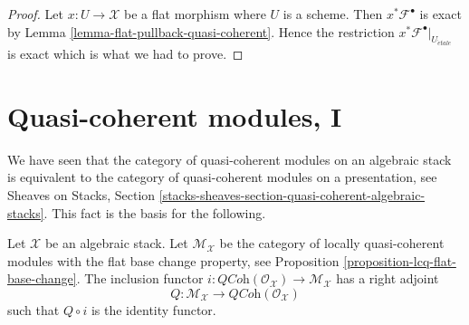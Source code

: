\begin{proof}
Let $x : U \to \mathcal{X}$ be a flat morphism where $U$ is a scheme.
Then $x^*\mathcal{F}^\bullet$ is exact by
Lemma \ref{lemma-flat-pullback-quasi-coherent}.
Hence the restriction $x^*\mathcal{F}^\bullet|_{U_{\acute{e}tale}}$
is exact which is what we had to prove.
\end{proof}





\section{Quasi-coherent modules, I}
\label{section-quasi-coherent}

\noindent
We have seen that the category of quasi-coherent modules on an algebraic
stack is equivalent to the category of quasi-coherent modules on a
presentation, see
Sheaves on Stacks, Section
\ref{stacks-sheaves-section-quasi-coherent-algebraic-stacks}.
This fact is the basis for the following.

\begin{lemma}
\label{lemma-adjoint}
Let $\mathcal{X}$ be an algebraic stack. Let $\mathcal{M}_\mathcal{X}$
be the category of locally quasi-coherent modules with the
flat base change property, see
Proposition \ref{proposition-lcq-flat-base-change}.
The inclusion functor
$i : \textit{QCoh}(\mathcal{O}_\mathcal{X}) \to \mathcal{M}_\mathcal{X}$
has a right adjoint
$$
Q : \mathcal{M}_\mathcal{X} \to \textit{QCoh}(\mathcal{O}_\mathcal{X})
$$
such that $Q \circ i$ is the identity functor.
\end{lemma}

